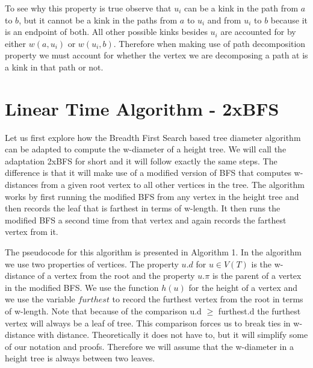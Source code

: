 To see why this property is true observe that $u_i$ can be a kink in the path from $a$ to $b$, but it cannot be a kink in the paths from $a$ to $u_i$ and from $u_i$ to $b$ because it is an endpoint of both. All other possible kinks besides $u_i$ are accounted for by either $w(a, u_i)$ or $w(u_i, b)$. Therefore when making use of path decomposition property we must account for whether the vertex we are decomposing a path at is a kink in that path or not.


\section{Linear Time Algorithm - 2xBFS}

Let us first explore how the Breadth First Search based tree diameter algorithm can be adapted to compute the w-diameter of a height tree. We will call the adaptation 2xBFS for short and it will follow exactly the same steps. The difference is that it will make use of a modified version of BFS that computes w-distances from a given root vertex to all other vertices in the tree. The algorithm works by first running the modified BFS from any vertex in the height tree and then records the leaf that is farthest in terms of w-length. It then runs the modified BFS a second time from that vertex and again records the farthest vertex from it.

The pseudocode for this algorithm is presented in Algorithm 1. In the algorithm we use two properties of vertices. The property $u.d$ for $u \in V(T)$ is the w-distance of a vertex from the root and the property $u.\pi$ is the parent of a vertex in the modified BFS. We use the function $h(u)$ for the height of a vertex and we use the variable $furthest$ to record the furthest vertex from the root in terms of w-length. Note that because of the comparison u.d $\ge$ furthest.d the furthest vertex will always be a leaf of tree. This comparison forces us to break ties in w-distance with distance. Theoretically it does not have to, but it will simplify some of our notation and proofs. Therefore we will assume that the w-diameter in a height tree is always between two leaves.

